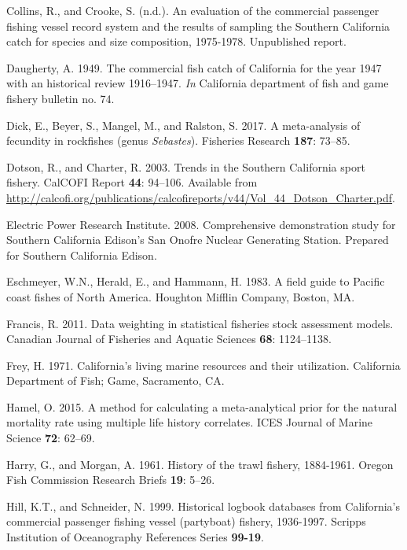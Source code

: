 \documentclass[12pt,]{article}
\begin{document}
\hypertarget{ref-Collins1978}{}
Collins, R., and Crooke, S. (n.d.). An evaluation of the commercial
passenger fishing vessel record system and the results of sampling the
Southern California catch for species and size composition, 1975-1978.
Unpublished report.

\hypertarget{ref-Daugherty1949}{}
Daugherty, A. 1949. The commercial fish catch of California for the year
1947 with an historical review 1916--1947. \emph{In} California
department of fish and game fishery bulletin no. 74.

\hypertarget{ref-Dick2017}{}
Dick, E., Beyer, S., Mangel, M., and Ralston, S. 2017. A meta-analysis
of fecundity in rockfishes (genus \emph{Sebastes}). Fisheries Research
\textbf{187}: 73--85.

\hypertarget{ref-Dotson2003}{}
Dotson, R., and Charter, R. 2003. Trends in the Southern California
sport fishery. CalCOFI Report \textbf{44}: 94--106. Available from
\url{http://calcofi.org/publications/calcofireports/v44/Vol_44_Dotson_Charter.pdf}.

\hypertarget{ref-EPRI2008}{}
Electric Power Research Institute. 2008. Comprehensive demonstration
study for Southern California Edison's San Onofre Nuclear Generating
Station. Prepared for Southern California Edison.

\hypertarget{ref-Eschmeyer1983}{}
Eschmeyer, W.N., Herald, E., and Hammann, H. 1983. A field guide to
Pacific coast fishes of North America. Houghton Mifflin Company, Boston,
MA.

\hypertarget{ref-Francis2011}{}
Francis, R. 2011. Data weighting in statistical fisheries stock
assessment models. Canadian Journal of Fisheries and Aquatic Sciences
\textbf{68}: 1124--1138.

\hypertarget{ref-Frey1971}{}
Frey, H. 1971. California's living marine resources and their
utilization. California Department of Fish; Game, Sacramento, CA.

\hypertarget{ref-Hamel2015}{}
Hamel, O. 2015. A method for calculating a meta-analytical prior for the
natural mortality rate using multiple life history correlates. ICES
Journal of Marine Science \textbf{72}: 62--69.

\hypertarget{ref-Harry1961}{}
Harry, G., and Morgan, A. 1961. History of the trawl fishery, 1884-1961.
Oregon Fish Commission Research Briefs \textbf{19}: 5--26.

\hypertarget{ref-Hill1999}{}
Hill, K.T., and Schneider, N. 1999. Historical logbook databases from
California's commercial passenger fishing vessel (partyboat) fishery,
1936-1997. Scripps Institution of Oceanography References Series
\textbf{99-19}.
\end{document}
